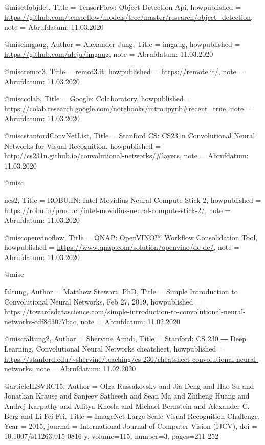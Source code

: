 
@misc{tfobjdet,
  Title = {{TensorFlow: Object Detection Api}},
  howpublished = {\url{https://github.com/tensorflow/models/tree/master/research/object_detection}},
  note = {Abrufdatum: 11.03.2020}
}

@misc{imgaug,
  Author = {Alexander Jung},
  Title = {{imgaug}},
  howpublished = {\url{https://github.com/aleju/imgaug}},
  note = {Abrufdatum: 11.03.2020}
}

@misc{remot3,
  Title = {{remot3.it}},
  howpublished = {\url{https://remote.it/}},
  note = {Abrufdatum: 11.03.2020}
}

@misc{colab,
  Title = {{Google: Colaboratory}},
  howpublished = {\url{https://colab.research.google.com/notebooks/intro.ipynb#recent=true}},
  note = {Abrufdatum: 11.03.2020}
}

@misc{stanfordConvNetList,
  Title = {{Stanford CS: CS231n Convolutional Neural Networks for Visual Recognition}},
  howpublished = {\url{http://cs231n.github.io/convolutional-networks/#layers}},
  note = {Abrufdatum: 11.03.2020}
}

@misc{ncs2,
  Title = {{ROBU.IN: Intel Movidius Neural Compute Stick 2}},
  howpublished = {\url{https://robu.in/product/intel-movidius-neural-compute-stick-2/}},
  note = {Abrufdatum: 11.03.2020}

}
@misc{openvinoflow,
  Title = {{QNAP: OpenVINO™ Workflow Consolidation Tool}},
  howpublished = {\url{https://www.qnap.com/solution/openvino/de-de/}},
  note = {Abrufdatum: 11.03.2020}
}

@misc{faltung,
  Author = {Matthew Stewart, PhD},
  Title = {{Simple Introduction to Convolutional Neural Networks}, Feb 27, 2019},
  howpublished = {\url{https://towardsdatascience.com/simple-introduction-to-convolutional-neural-networks-cdf8d3077bac}},
  note = {Abrufdatum: 11.02.2020}

}

 @misc{faltung2,
  Author = {Shervine Amidi},
  Title = {{Stanford: CS 230 ― Deep Learning, Convolutional Neural Networks cheatsheet}},
  howpublished = {\url{https://stanford.edu/~shervine/teaching/cs-230/cheatsheet-convolutional-neural-networks}},
  note = {Abrufdatum: 11.02.2020}
}


@article{ILSVRC15,
Author = {Olga Russakovsky and Jia Deng and Hao Su and Jonathan Krause and Sanjeev Satheesh and Sean Ma and Zhiheng Huang and Andrej Karpathy and Aditya Khosla and Michael Bernstein and Alexander C. Berg and Li Fei-Fei},
Title = {{ImageNet Large Scale Visual Recognition Challenge}},
Year = {2015},
journal   = {International Journal of Computer Vision (IJCV)},
doi = {10.1007/s11263-015-0816-y},
volume={115},
number={3},
pages={211-252}
}

